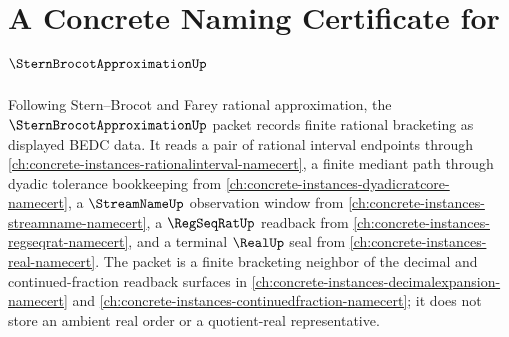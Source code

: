 \chapter{A Concrete Naming Certificate for $\SternBrocotApproximationUp$}
\label{ch:concrete-instances-stern-brocot-approximation-namecert}

Following Stern--Brocot and Farey rational approximation, the $\SternBrocotApproximationUp$ packet records finite rational bracketing as displayed BEDC data. It reads a pair of rational interval endpoints through \autoref{ch:concrete-instances-rationalinterval-namecert}, a finite mediant path through dyadic tolerance bookkeeping from \autoref{ch:concrete-instances-dyadicratcore-namecert}, a $\StreamNameUp$ observation window from \autoref{ch:concrete-instances-streamname-namecert}, a $\RegSeqRatUp$ readback from \autoref{ch:concrete-instances-regseqrat-namecert}, and a terminal $\RealUp$ seal from \autoref{ch:concrete-instances-real-namecert}. The packet is a finite bracketing neighbor of the decimal and continued-fraction readback surfaces in \autoref{ch:concrete-instances-decimalexpansion-namecert} and \autoref{ch:concrete-instances-continuedfraction-namecert}; it does not store an ambient real order or a quotient-real representative.

